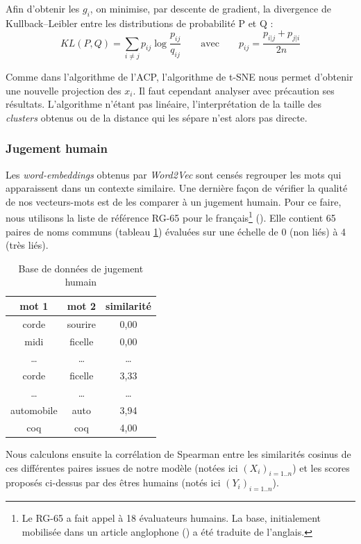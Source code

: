 \documentclass[11pt,french,french]{article}
\let\rmarkdownfootnote\footnote%
\def\footnote{\protect\rmarkdownfootnote}
\begin{document}
Afin d'obtenir les \(g_i\), on minimise, par descente de gradient, la
divergence de Kullback--Leibler entre les distributions de probabilité P
et Q :
\[KL(P,Q) = \sum_{i \neq j} { p_{ij} \log{\frac{p_{ij}}{q_{ij}}}} \qquad\text{avec}\qquad p_{ij} = \frac{p_{i|j} + p_{j|i}}{2n}\]

Comme dans l'algorithme de l'ACP, l'algorithme de t-SNE nous permet
d'obtenir une nouvelle projection des \(x_i\). Il faut cependant
analyser avec précaution ses résultats. L'algorithme n'étant pas
linéaire, l'interprétation de la taille des \emph{clusters} obtenus ou
de la distance qui les sépare n'est alors pas directe.

\subsubsection{Jugement humain}\label{sec:jugementHumain}

Les \emph{word-embeddings} obtenus par \emph{Word2Vec} sont censés
regrouper les mots qui apparaissent dans un contexte similaire. Une
dernière façon de vérifier la qualité de nos vecteurs-mots est de les
comparer à un jugement humain. Pour ce faire, nous utilisons la liste de
référence RG-65 pour le français\footnote{Le RG-65 a fait appel à 18
  évaluateurs humains. La base, initialement mobilisée dans un article
  anglophone (\cite{Rubenstein}) a été traduite de l'anglais.}
(\cite{Boumedyen}). Elle contient 65 paires de noms communs (tableau
\ref{table:human_judgement}) évaluées sur une échelle de 0 (non liés) à
4 (très liés).

\begin{table}
\begin{center}
\begin{tabular}{|c|c|c|}
    \hline
    mot 1 & mot 2 & similarité  \tabularnewline
    \hline
    corde & sourire & 0,00   \tabularnewline
    midi & ficelle & 0,00   \tabularnewline
    \dots & \dots & \dots   \tabularnewline
    corde & ficelle & 3,33   \tabularnewline
    \dots & \dots & \dots   \tabularnewline
    automobile & auto & 3,94   \tabularnewline
    coq & coq & 4,00   \tabularnewline
    \hline
 \end{tabular}
\captionsetup{margin=0cm,format=hang,justification=justified}
\caption{Base de données de jugement humain}\label{table:human_judgement}
\end{center}
\end{table}

Nous calculons ensuite la corrélation de Spearman entre les similarités
cosinus de ces différentes paires issues de notre modèle (notées ici
\((X_i)_{i=1..n}\)) et les scores proposés ci-dessus par des êtres
humains (notés ici \((Y_i)_{i=1..n}\)).
\end{document}
